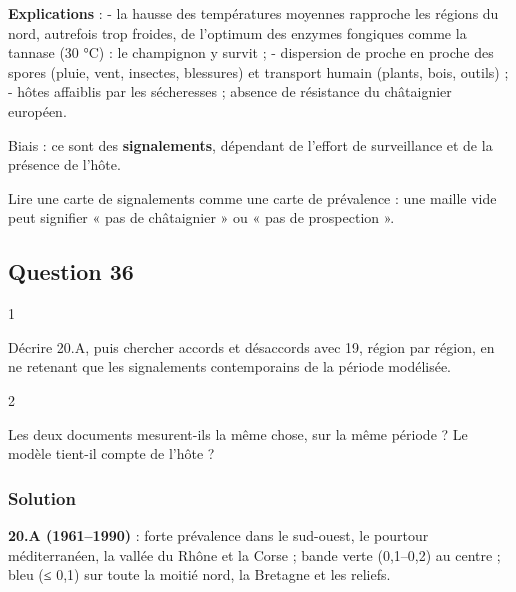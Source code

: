 \documentclass[11pt,a4paper]{article}
\begin{document}
\textbf{Explications} :
- la hausse des températures moyennes rapproche les régions du nord, autrefois trop froides, de l'optimum des enzymes fongiques comme la tannase (30 °C) : le champignon y survit ;
- dispersion de proche en proche des spores (pluie, vent, insectes, blessures) et transport humain (plants, bois, outils) ;
- hôtes affaiblis par les sécheresses ; absence de résistance du châtaignier européen.

Biais : ce sont des \textbf{signalements}, dépendant de l'effort de surveillance et de la présence de l'hôte.

\begin{piege}

Lire une carte de signalements comme une carte de prévalence : une maille vide peut signifier « pas de châtaignier » ou « pas de prospection ».

\end{piege}

\hypertarget{question-36}{%
\subsection{Question 36}\label{question-36}}

\begin{indication}{1}

Décrire 20.A, puis chercher accords et désaccords avec 19, région par région, en ne retenant que les signalements contemporains de la période modélisée.

\end{indication}

\begin{indication}{2}

Les deux documents mesurent-ils la même chose, sur la même période ? Le modèle tient-il compte de l'hôte ?

\end{indication}

\hypertarget{solution-36}{%
\subsubsection{Solution}\label{solution-36}}

\textbf{20.A (1961--1990)} : forte prévalence dans le sud-ouest, le pourtour méditerranéen, la vallée du Rhône et la Corse ; bande verte (0,1--0,2) au centre ; bleu (≤ 0,1) sur toute la moitié nord, la Bretagne et les reliefs.
\end{document}
